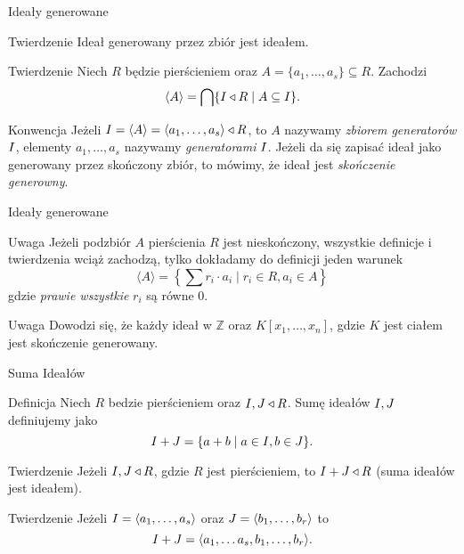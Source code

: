 \documentclass{beamer}
\newcommand{\II}{\mathnormal{I}}
\newcommand{\JJ}{\mathnormal{J}}
\begin{document}
\begin{frame}{Ideały generowane}
    \begin{block}{Twierdzenie}
        Ideał generowany przez zbiór jest ideałem.
    \end{block}
    \begin{block}{Twierdzenie}
        Niech $R$ będzie pierścieniem oraz $A = \{a_1, \ldots , a_s\} \subseteq R$.
        Zachodzi
        $$\langle A \rangle = \bigcap\{\II \triangleleft R \mid A \subseteq \II \}.$$
    \end{block}    
    \pause 
    \begin{alertblock}{Konwencja}
        Jeżeli $\II = \langle A \rangle = \langle a_1 , \ldots , a_s \rangle  \triangleleft R$, to $A$ nazywamy \textit{zbiorem generatorów} $\II$, elementy $a_1, \ldots , a_s$ nazywamy \textit{generatorami} $\II$. Jeżeli da się zapisać ideał jako generowany przez skończony zbiór, to mówimy, że ideał jest \textit{skończenie generowny}.
    \end{alertblock}
\end{frame}

\begin{frame}{Ideały generowane}
    \begin{alertblock}{Uwaga}
        Jeżeli podzbiór $A$ pierścienia $R$ jest nieskończony, wszystkie definicje i twierdzenia wciąż zachodzą, tylko dokładamy do definicji jeden warunek
        $$ \langle A \rangle = \left\{ \sum r_i \cdot a_i \mid r_i \in R, a_i \in A \right\}$$ gdzie \textit{prawie wszystkie} $r_i$ są równe 0.    
    \end{alertblock}
    \pause 
    \begin{alertblock}{Uwaga}
        Dowodzi się, że każdy ideał w $\mathbb{Z}$ oraz $K[x_1, \ldots , x_n]$, gdzie $K$ jest ciałem jest skończenie generowany.
    \end{alertblock}
\end{frame}

\begin{frame}{Suma Ideałów}
    \begin{block}{Definicja}
        Niech $R$ bedzie pierścieniem oraz $\II, \JJ \triangleleft R$. \alert{Sumę ideałów $\II, \JJ$} definiujemy jako
        $$\II + \JJ = \{ a+b \mid a \in \II, b \in \JJ\}.$$
    \end{block}
    \pause 
    \begin{block}{Twierdzenie}
        Jeżeli $\II , \JJ \triangleleft R$, gdzie $R$ jest pierścieniem, to $\II + \JJ \triangleleft R$ (suma ideałów jest ideałem). 
    \end{block}
    \pause
    \begin{block}{Twierdzenie}
        Jeżeli $\II = \langle a_1, \ldots, a_s \rangle$ oraz $\JJ = \langle b_1, \ldots, b_r \rangle$ to 
        $$ \II + \JJ = \langle a_1, \ldots a_s, b_1, \ldots, b_r \rangle.$$
    \end{block}
\end{frame}
\end{document}

